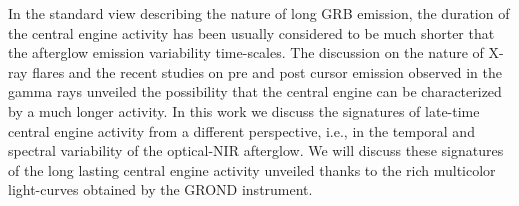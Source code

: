 


\bigskip



\bigskip

\noindent In the standard view describing the nature of long GRB emission, the duration of the central engine activity has been usually considered to be 
much shorter that the afterglow emission variability time-scales.
The discussion on the nature of X-ray flares and the recent studies on pre and post cursor emission observed in the gamma rays unveiled the possibility that the central engine can be characterized by a much longer activity. In this work we discuss the signatures of late-time central engine activity from a different perspective, i.e., in the temporal and spectral variability of the optical-NIR afterglow. We will discuss these signatures of the long lasting central engine activity unveiled thanks to the rich multicolor light-curves obtained by the GROND instrument.

